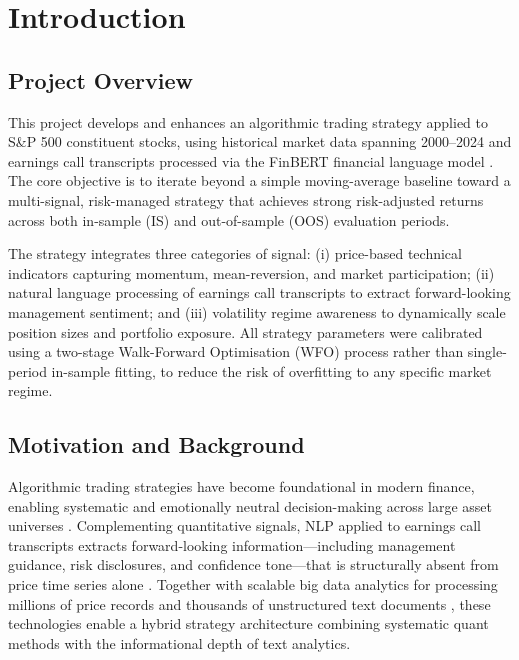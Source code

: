 \documentclass[11pt,twoside,a4paper]{article}
\begin{document}




\section{Introduction}

\subsection{Project Overview}

This project develops and enhances an algorithmic trading strategy applied to S\&P 500 constituent stocks, using historical market data spanning 2000--2024 and earnings call transcripts processed via the FinBERT financial language model \citep{Araci2019}. The core objective is to iterate beyond a simple moving-average baseline toward a multi-signal, risk-managed strategy that achieves strong risk-adjusted returns across both in-sample (IS) and out-of-sample (OOS) evaluation periods.

The strategy integrates three categories of signal: (i) price-based technical indicators capturing momentum, mean-reversion, and market participation; (ii) natural language processing of earnings call transcripts to extract forward-looking management sentiment; and (iii) volatility regime awareness to dynamically scale position sizes and portfolio exposure. All strategy parameters were calibrated using a two-stage Walk-Forward Optimisation (WFO) process rather than single-period in-sample fitting, to reduce the risk of overfitting to any specific market regime.

\subsection{Motivation and Background}

Algorithmic trading strategies have become foundational in modern finance, enabling systematic and emotionally neutral decision-making across large asset universes \citep{Lopez2018}. Complementing quantitative signals, NLP applied to earnings call transcripts extracts forward-looking information---including management guidance, risk disclosures, and confidence tone---that is structurally absent from price time series alone \citep{Huang2014}. Together with scalable big data analytics for processing millions of price records and thousands of unstructured text documents \citep{Manyika2011}, these technologies enable a hybrid strategy architecture combining systematic quant methods with the informational depth of text analytics.
\end{document}
